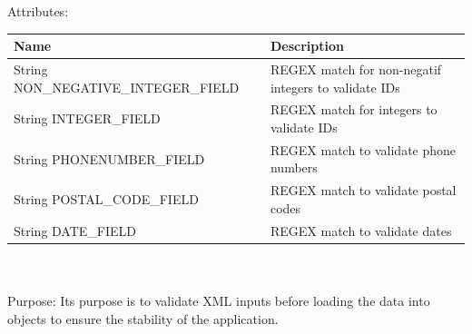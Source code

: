 Attributes:\\
\begin{tabular}{| l | l |}
\hline
 Name                                                        & Description\\
\hline
String NON\_NEGATIVE\_INTEGER\_FIELD  & REGEX match for non-negatif integers to validate IDs\\
\hline
String INTEGER\_FIELD                               & REGEX match for integers to validate IDs\\
\hline
String PHONENUMBER\_FIELD                    & REGEX match to validate phone numbers\\
\hline
String POSTAL\_CODE\_FIELD                    &  REGEX match to validate postal codes\\
\hline
String DATE\_FIELD                                    &  REGEX match to validate dates\\
\hline
\end{tabular}\\
\\

Purpose: Its purpose is to validate XML inputs before loading the data into objects to ensure the stability of the application.
\\
\\